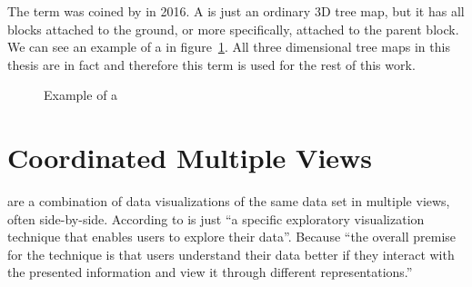 The term \tmap{} was coined by \textcite{Limberger2016} in 2016.
A \tmap{} is just an ordinary 3D tree map, but it has all blocks attached to the ground, or more specifically, attached to the parent block.
We can see an example of a \tmap{} in figure~\ref{fig:research:ua_treemap}.
All three dimensional tree maps in this thesis are in fact \tmaps{} and therefore this term is used for the rest of this work.

\begin{figure}[ht]
  \centering
  \caption{Example of a \tmap{}}\label{fig:research:ua_treemap}
\end{figure}


\section{Coordinated Multiple Views}\label{sec:related-work:cmvs}
\cmvs{} are a combination of data visualizations of the same data set in multiple views, often side-by-side.
According to \textcite{Roberts2007} \cmvs{} is just ``a specific exploratory visualization technique that enables users to explore their data''.
Because ``the overall premise for the technique is that users understand their data better if they interact with the presented information and view it through different representations.''~\cite{Roberts2007}

